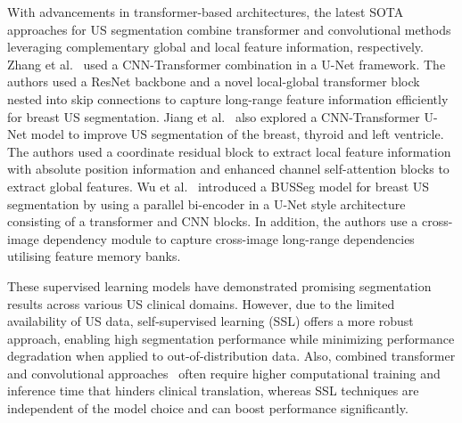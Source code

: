 With advancements in transformer-based architectures, the latest SOTA approaches for US segmentation combine transformer and convolutional methods leveraging complementary global and local feature information, respectively. Zhang et al.~\cite{zhang_hau-net_2024} used a CNN-Transformer combination in a U-Net framework. The authors used a ResNet backbone and a novel local-global transformer block nested into skip connections to capture long-range feature information efficiently for breast US segmentation. Jiang et al.~\cite{jiang_hybrid_2023} also explored a CNN-Transformer U-Net model to improve US segmentation of the breast, thyroid and left ventricle. The authors used a coordinate residual block to extract local feature information with absolute position information and enhanced channel self-attention blocks to extract global features. Wu et al.~\cite{wu_cross-image_2023} introduced a BUSSeg model for breast US segmentation by using a parallel bi-encoder in a U-Net style architecture consisting of a transformer and CNN blocks. In addition, the authors use a cross-image dependency module to capture cross-image long-range dependencies utilising feature memory banks. 


%
These supervised learning models have demonstrated promising segmentation results across various US clinical domains. However, due to the limited availability of US data, self-supervised learning (SSL) offers a more robust approach, enabling high segmentation performance while minimizing performance degradation when applied to out-of-distribution data. Also, combined transformer and convolutional approaches~\cite{wu_cross-image_2023,jiang_hybrid_2023,zhang_hau-net_2024}  often require higher computational training and inference time that hinders clinical translation, whereas SSL techniques are independent of the model choice and can boost performance significantly.


